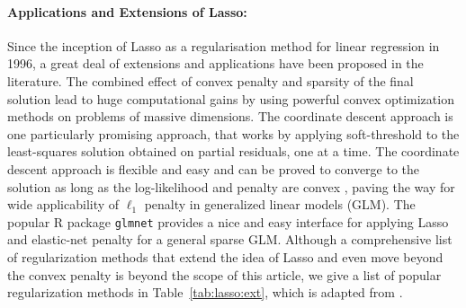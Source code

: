 \documentclass[11pt]{article}
\begin{document}
\paragraph{Applications and Extensions of Lasso:} Since the inception of Lasso
as a regularisation method for linear regression in 1996, a great deal of
extensions and applications have been proposed in the literature. The combined
effect of convex penalty and sparsity of the final solution lead to huge
computational gains by using powerful convex optimization methods on problems
of massive dimensions. The coordinate descent approach
\citep{friedman2007pathwise,friedman2010regularization} is one particularly
promising approach, that works by applying soft-threshold to the least-squares
solution obtained on partial residuals, one at a time. The coordinate descent
approach is flexible and easy and can be proved to converge to the solution as
long as the log-likelihood and penalty are convex \citep{tseng2001convergence},
paving the way for wide applicability of $\ell_1$ penalty in generalized linear
models (GLM). The popular R package \texttt{glmnet} provides a nice and easy
interface for applying Lasso and elastic-net penalty for a general sparse GLM.
Although a comprehensive list of regularization methods that extend the idea of
Lasso and even move beyond the convex penalty is beyond the scope of this
article, we give a list of popular regularization methods in 
Table~\ref{tab:lasso:ext}, which is adapted from \citet{tibshirani2014praise}.
\end{document}
